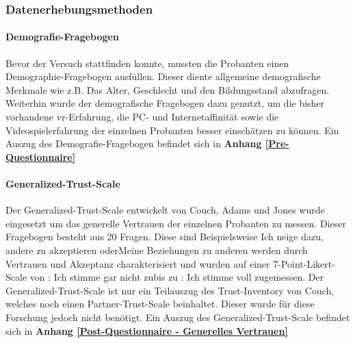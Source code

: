 \documentclass[a4paper,11pt]{article}%
\renewcommand{\\}{\vspace*{0.5\baselineskip} \newline}
\begin{document}
		\subsubsection{Datenerhebungsmethoden}
			
			\paragraph{Demografie-Fragebogen}
Bevor der Versuch stattfinden konnte, mussten die Probanten einen Demographie-Fragebogen ausfüllen. Dieser diente allgemeine demografische Merkmale wie z.B. Das Alter, Geschlecht und den Bildungsstand abzufragen. Weiterhin wurde der demografische Fragebogen dazu genutzt, um die bisher vorhandene \ac{vr}-Erfahrung, die PC- und Internetaffinität sowie die Videospielerfahrung der einzelnen Probanten besser einschätzen zu können.
\\Ein Auszug des Demografie-Fragebogen befindet sich in \textbf{Anhang \ref{Pre-Questionnaire}}

			\paragraph{Generalized-Trust-Scale}
Der Generalized-Trust-Scale entwickelt von Couch, Adams und Jones \citep{couch1996assessment} wurde eingesetzt um das generelle Vertrauen der einzelnen Probanten zu messen.
Dieser Fragebogen besteht aus 20 Fragen. Diese sind Beispielsweise \flqq Ich neige dazu, andere zu akzeptieren \frqq oder\flqq Meine Beziehungen zu anderen werden durch Vertrauen und Akzeptanz charakterisiert \frqq und wurden auf einer 7-Point-Likert-Scale von : Ich stimme gar nicht zu\frqq bis zu  : Ich stimme voll zu\frqq gemessen. Der Generalized-Trust-Scale ist nur ein Teilauszug des \flqq Trust-Inventory von Couch\frqq, welches noch einen \flqq Partner-Trust-Scale \frqq beinhaltet. Dieser wurde für diese Forschung jedoch nicht benötigt. 
\\Ein Auszug des Generalized-Trust-Scale befindet sich in \textbf{Anhang \ref{Post-Questionnaire - Generelles Vertrauen}}

%			
\end{document}
